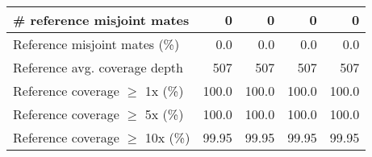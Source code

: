 \documentclass[12pt,a4paper]{article}
\begin{document}
\begin{table}[ht]
\begin{center}
\begin{tabular}{|l*{4}{|r}|}
\# reference misjoint mates & 0 & 0 & 0 & 0 \\ \hline
Reference misjoint mates (\%) & 0.0 & 0.0 & 0.0 & 0.0 \\ \hline
Reference avg. coverage depth & 507 & 507 & 507 & 507 \\ \hline
Reference coverage $\geq$ 1x (\%) & 100.0 & 100.0 & 100.0 & 100.0 \\ \hline
Reference coverage $\geq$ 5x (\%) & 100.0 & 100.0 & 100.0 & 100.0 \\ \hline
Reference coverage $\geq$ 10x (\%) & 99.95 & 99.95 & 99.95 & 99.95 \\ \hline
\end{tabular}
\end{center}
\end{table}
\end{document}
